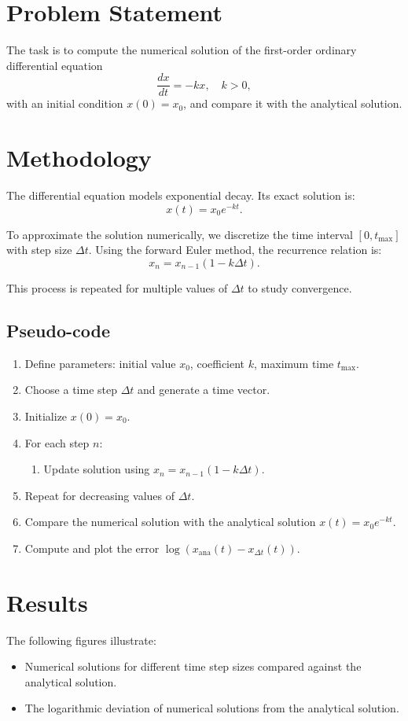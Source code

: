 \section*{Problem Statement}
The task is to compute the numerical solution of the first-order ordinary differential equation
\[
    \frac{dx}{dt} = -kx, \quad k > 0,
\]
with an initial condition $x(0) = x_0$, and compare it with the analytical solution.

\section*{Methodology}
The differential equation models exponential decay. Its exact solution is:
\[
    x(t) = x_0 e^{-kt}.
\]

To approximate the solution numerically, we discretize the time interval $[0, t_{\max}]$ with step size $\Delta t$. Using the forward Euler method, the recurrence relation is:
\[
    x_{n} = x_{n-1} (1 - k \Delta t).
\]

This process is repeated for multiple values of $\Delta t$ to study convergence.

\subsection*{Pseudo-code}
\begin{enumerate}
    \item Define parameters: initial value $x_0$, coefficient $k$, maximum time $t_{\max}$.
    \item Choose a time step $\Delta t$ and generate a time vector.
    \item Initialize $x(0) = x_0$.
    \item For each step $n$:
    \begin{enumerate}
        \item Update solution using $x_{n} = x_{n-1}(1 - k \Delta t)$.
    \end{enumerate}
    \item Repeat for decreasing values of $\Delta t$.
    \item Compare the numerical solution with the analytical solution $x(t) = x_0 e^{-kt}$.
    \item Compute and plot the error $\log(x_{\text{ana}}(t) - x_{\Delta t}(t))$.
\end{enumerate}

\section*{Results}
The following figures illustrate:
\begin{itemize}
    \item Numerical solutions for different time step sizes compared against the analytical solution.
    \item The logarithmic deviation of numerical solutions from the analytical solution.
\end{itemize}

